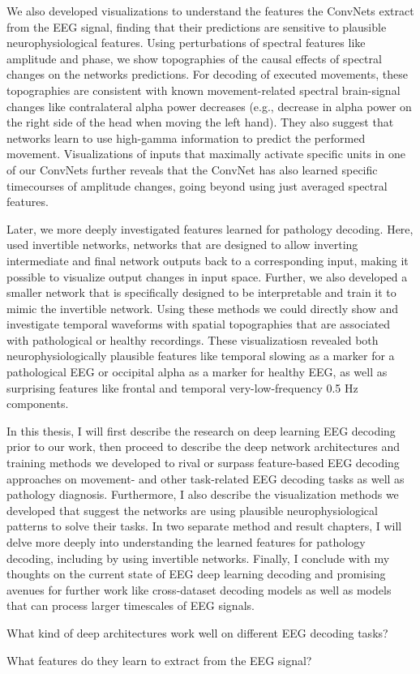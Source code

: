 We also developed visualizations to understand the features the ConvNets
extract from the EEG signal, finding that their predictions are
sensitive to plausible neurophysiological features. Using perturbations
of spectral features like amplitude and phase, we show topographies of
the causal effects of spectral changes on the networks predictions. For
decoding of executed movements, these topographies are consistent with
known movement-related spectral brain-signal changes like contralateral
alpha power decreases (e.g., decrease in alpha power on the right side
of the head when moving the left hand). They also suggest that networks
learn to use high-gamma information to predict the performed movement.
Visualizations of inputs that maximally activate specific units in one
of our ConvNets further reveals that the ConvNet has also learned
specific timecourses of amplitude changes, going beyond using just
averaged spectral features.

Later, we more deeply investigated features learned for pathology
decoding. Here, used invertible networks, networks that are
designed to allow inverting intermediate and final network outputs
back to a corresponding input, making it possible to visualize output changes in input space. Further, we also developed a smaller network that is
specifically designed to be interpretable and train it to mimic the
invertible network. Using these methods we could directly show and
investigate temporal waveforms with spatial topographies that are
associated with pathological or healthy recordings. These visualizatiosn
revealed both neurophysiologically plausible features like temporal
slowing as a marker for a pathological EEG or occipital alpha as a
marker for healthy EEG, as well as surprising features like frontal and
temporal very-low-frequency 0.5 Hz components.

    In this thesis, I will first describe the research on deep learning EEG
decoding prior to our work, then proceed to describe the deep network
architectures and training methods we developed to rival or surpass
feature-based EEG decoding approaches on movement- and other
task-related EEG decoding tasks as well as pathology diagnosis.
Furthermore, I also describe the visualization methods we developed that
suggest the networks are using plausible neurophysiological patterns to
solve their tasks. In two separate method and result chapters, I will
delve more deeply into understanding the learned features for pathology
decoding, including by using invertible networks. Finally, I conclude
with my thoughts on the current state of EEG deep learning decoding and
promising avenues for further work like cross-dataset decoding models as
well as models that can process larger timescales of EEG signals.

\begin{openbox}
\item What kind of deep architectures work well on different EEG decoding tasks?
\item What features do they learn to extract from the EEG signal?
\end{openbox}
